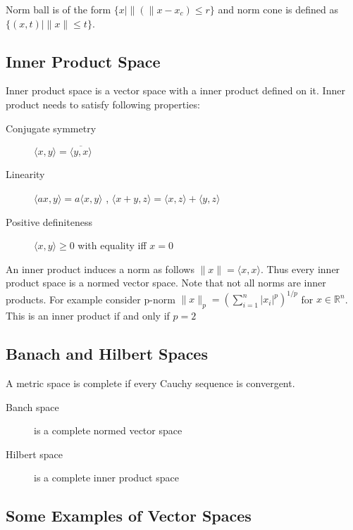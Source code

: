 \documentclass[a4paper,11pt]{article}
\newcommand{\Rn}{\mathbb{R}^n}
\newcommand{\norm}[1]{\|#1\|}
\newcommand*\conj[1]{\overline{#1}}
\newcommand\inrpd[2]{\langle #1, #2 \rangle}
\begin{document}
Norm ball is of the form $\{x \mid \norm(x-x_c) \leq r \}$ and norm cone is defined as $\{(x,t) \mid \norm{x} \leq t \}$.

\subsection{Inner Product Space}
Inner product space is a vector space with a inner product defined on it. Inner product needs to satisfy following properties:
\begin{description}
\item[Conjugate symmetry] $\inrpd{x}{y}= \conj{\inrpd{y}{x}}$
\item[Linearity] $\inrpd{ax}{y} = a  \inrpd{x}{y}$ , $\inrpd{x+y}{z} =  \inrpd{x}{z}+ \inrpd{y}{z}$
\item[Positive definiteness] $\inrpd{x}{y} \geq 0$ with equality iff $x = 0$
\end{description} 

An inner product induces a norm as follows $\|x\| = \inrpd{x}{x}$. Thus every inner product space is a normed vector space.
Note that not all norms are inner products. For example consider p-norm $\|x\|_p = \left(\sum_{i = 1}^n |x_i|^p \right)^{1/p}$ for $x \in \Rn$. This is an inner product if and only if $p = 2$

\subsection{Banach and Hilbert Spaces}
A metric space is complete if every Cauchy sequence is convergent.
\begin{description}
\item[Banch space] is a complete normed vector space
\item[Hilbert space] is a complete inner product space
\end{description}

\subsection{Some Examples of Vector Spaces}
\end{document}
